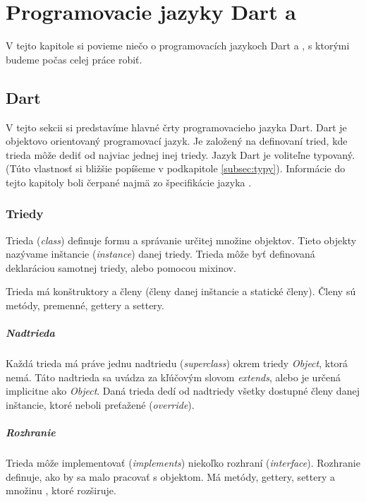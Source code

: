 \chapter{Programovacie jazyky Dart a \JS{}}

\label{kap:jazyky} %

V tejto kapitole si povieme niečo o programovacích jazykoch Dart a \JS{}, s ktorými budeme počas celej práce robiť.

\section{Dart}
\label{sec:dart}
V tejto sekcii si predstavíme hlavné črty programovacieho jazyka Dart. Dart je objektovo orientovaný programovací jazyk. Je založený na definovaní tried, kde trieda môže dediť od najviac jednej inej triedy. 
Jazyk Dart je voliteľne typovaný. (Túto vlastnosť si bližšie popíšeme v podkapitole \ref{subsec:typy}). 
Informácie do tejto kapitoly boli čerpané najmä zo špecifikácie jazyka \cite{DartLanguage}.

\subsection{Triedy}
Trieda (\emph{class}) definuje formu a správanie určitej množine objektov. Tieto objekty nazývame inštancie (\emph{instance}) danej triedy. 
Trieda môže byť definovaná deklaráciou samotnej triedy, alebo pomocou mixinov.

Trieda má konštruktory a členy (členy danej inštancie a statické členy). Členy sú metódy, premenné, gettery a settery. 

\paragraph{Nadtrieda}
Každá trieda má práve jednu nadtriedu (\emph{superclass}) okrem triedy \emph{Object}, ktorá nemá. Táto nadtrieda sa uvádza za kľúčovým slovom \emph{extends}, alebo je určená implicitne ako \emph{Object}. %
Daná trieda dedí od nadtriedy všetky dostupné členy danej inštancie, ktoré neboli preťažené (\emph{override}).

\paragraph{Rozhranie}
Trieda môže implementovať (\emph{implements}) niekoľko rozhraní (\emph{interface}). Rozhranie definuje, ako by sa malo pracovať s objektom. 
Má metódy, gettery, settery a množinu , ktoré rozširuje.

